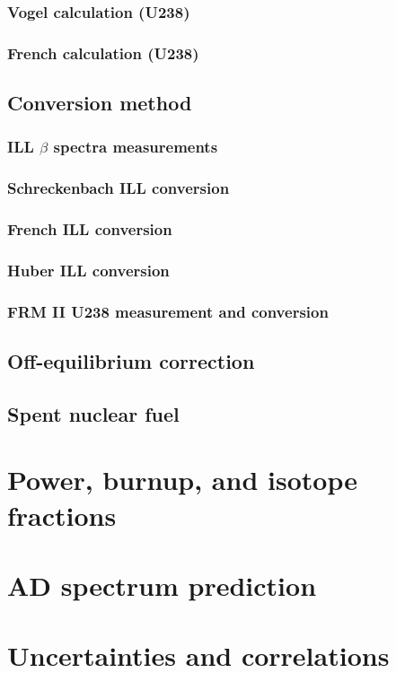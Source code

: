 \documentclass[../thesis.tex]{subfiles}
\begin{document}
\subsubsection{Vogel calculation (U238)}
\label{sec:vogel}

\subsubsection{French calculation (U238)}
\label{sec:french238}

\subsection{Conversion method}
\label{sec:conversion}

\subsubsection{ILL $\beta$ spectra measurements}
\label{sec:illmeas}

\subsubsection{Schreckenbach ILL conversion}
\label{sec:schreck}

\subsubsection{French ILL conversion}
\label{sec:frenchconv}

\subsubsection{Huber ILL conversion}
\label{sec:huberconv}

\subsubsection{FRM II U238 measurement and conversion}
\label{sec:u238conv}

\subsection{Off-equilibrium correction}
\label{sec:offeqcorr}

\subsection{Spent nuclear fuel}
\label{sec:snfcorr}

\section{Power, burnup, and isotope fractions}
\label{sec:reacpow}

\section{AD spectrum prediction}
\label{sec:adspectra}

\section{Uncertainties and correlations}
\label{sec:reacunccorr}
\end{document}
